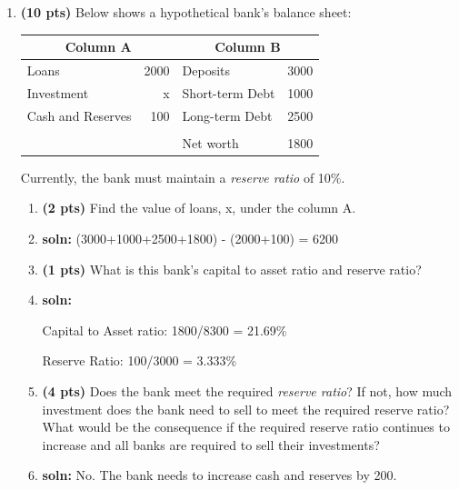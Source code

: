 \documentclass[14pt, oneside]{memoir}
\begin{document}
\begin{enumerate}[label=\textbf{\arabic*.}, itemsep=15pt]

\item \textbf{(10  pts)}\label{P1}  Below shows a hypothetical bank's balance sheet:

\begin{table}[htbp]
	\centering
	\begin{tabular}{lr|lr}
		\toprule
		\multicolumn{2}{c}{Column A} & \multicolumn{2}{c}{Column B} \\
		\midrule
		Loans & 2000  & Deposits & 3000 \\
		Investment & x  & Short-term Debt & 1000 \\
		Cash and Reserves & 100  & Long-term Debt & 2500 \\
		&       &       &  \\
		&       & Net worth & 1800 \\
		\bottomrule
	\end{tabular}%
\end{table}%
Currently, the bank must maintain a \textit{reserve ratio} of 10\%.

\begin{enumerate}[label=(\alph*)]
	\item \textbf{(2  pts)}  Find the value of loans, x, under the column A.
	\vspace{1cm}
	\item[] \textbf{soln:} (3000+1000+2500+1800) - (2000+100) = 6200
	
	\vspace{2cm}
	\item \textbf{(1  pts)} What is this bank’s capital to asset ratio and reserve ratio?
	
	\item[] \textbf{soln:} 
	
	Capital to Asset ratio: 1800/8300 = 21.69\%
	
	
	Reserve Ratio: 100/3000 = 3.333\%
	\newpage
	
	\item \textbf{(4  pts)} Does the bank meet the required \textit{reserve ratio}? If not, how much investment does the bank need to sell to meet the required reserve ratio? What would be the consequence if the required reserve ratio continues to increase and all banks are required to sell their investments?
	
	\vspace{1cm}
   \item[] \textbf{soln:} No. The bank needs to increase cash and reserves by 200. 


\end{enumerate}
\end{enumerate}
\end{document}
